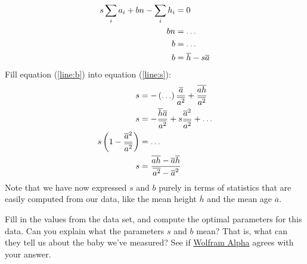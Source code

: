 \documentclass[11pt]{article}
\begin{document}
\begin{Exercise}
\begin{align}
	s \sum_i {a_i} + bn - \sum_i h_i &=0 \notag \\
	bn &= \ans{\sum_ih_i - s\sum_i a_i}{\ldots} \notag\\
	b &= \ans{\frac{1}{n}\sum_ih_i - s\frac{1}{n}\sum_i a_i}{\ldots} \notag\\
	b &= \overline{h}-s\overline{a} \label{line:b}
\end{align}
Fill equation (\ref{line:b}) into equation (\ref{line:s}):
\begin{align*}
s &= -\left(\ans{\overline{h}-s\overline{a}}{\ldots}\right)\frac{\overline{a}}{\overline{a^2}} + \frac{\overline{ah}}{\overline{a^2}} \\
s &= - \frac{\overline{h}\overline{a}}{\overline{a^2}} + s \frac{\overline{a}^2}{\overline{a^2}} + \ans{\frac{\overline{ah}}{\overline{a^2}}}{\ldots} \\
 s \left(1-\frac{\overline{a}^2}{\overline{a^2}}\right)&= \ans{- \frac{\overline{h}\overline{a}}{\overline{a^2}} +\frac{\overline{ah}}{\overline{a^2}}}{\ldots} \\
 s &= \frac{\overline{ah} - \overline{a}\overline{h}}{\overline{a^2} - \overline{a}^2} \\
\end{align*}
\noindent Note that we have now expressed $s$ and $b$ purely in terms of statistics that are easily computed from our data, like the mean height $\overline{h}$ and the mean age $\overline{a}$.
\end{Exercise}

\begin{Exercise}
\noindent Fill in the values from the data set, and compute the optimal parameters for this data. Can you explain what the parameters $s$ and $b$ mean? That is, what can they tell us about the baby we've measured?
See if \href{https://goo.gl/dEcRBG}{Wolfram Alpha} agrees with your answer.
\end{Exercise}
\end{document}
